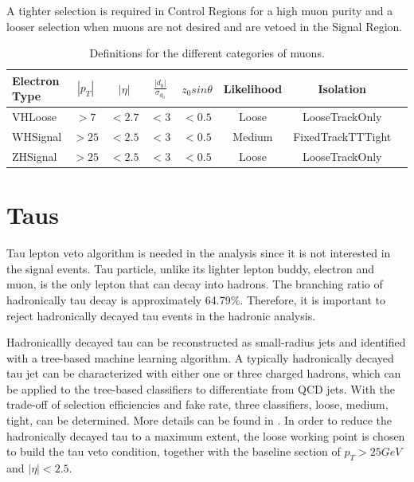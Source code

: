 A tighter selection is required in Control Regions for a high muon purity and a looser selection when muons are not desired and are vetoed in the Signal Region.
\begin{table}[tbh]
\centering
\begin{tabular}{|l|c|c|c|c|c|c|c}

\hline
  Electron Type & $|p_T|$ &$|\eta|$ & $\frac{|d_0|}{\sigma_{d_0}}$&$z_0 sin\theta$ & Likelihood &Isolation \\
\hline 
VHLoose &$>7$&$<2.7$&$<3$&$<0.5$&Loose&LooseTrackOnly\\
\hline 
WHSignal &$>25$&$<2.5$&$<3$&$<0.5$&Medium&FixedTrackTTTight\\
\hline 
ZHSignal &$>25$&$<2.5$&$<3$&$<0.5$&Loose&LooseTrackOnly\\
\hline
\end{tabular}
\caption{Definitions for the different categories of muons.}
 \label{tab:mu}
\end{table}


\section{Taus}
\label{sec:taus}
\par Tau lepton veto algorithm is needed in the analysis since it is not interested in the signal events. Tau particle, unlike its lighter lepton buddy, electron and muon, 
is the only lepton that can decay into hadrons. The branching ratio of hadronically tau decay is approximately 64.79\%. Therefore, it is important to reject hadronically decayed 
tau events in the hadronic analysis.

\par Hadronicallly decayed tau can be reconstructed as small-radius jets and identified with a tree-based machine learning algorithm. A typically hadronically decayed tau jet 
can be characterized with either one or three charged hadrons, which can be applied to the tree-based classifiers to differentiate from QCD jets. With the trade-off of selection 
efficiencies and fake rate, three classifiers, loose, medium, tight, can be determined. More details can be found in \cite{ATL-PHYS-PUB-2015-045}. 
In order to reduce the hadronically decayed tau to a maximum extent, the loose working point is chosen to build the tau veto condition, together with the baseline section of $p_T > 25 GeV$ and $|\eta| < 2.5$.

